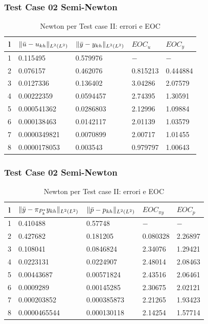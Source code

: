 \documentclass{beamer}
\theoremstyle{definition}
\theoremstyle{remark}
\theoremstyle{plain}
\theoremstyle{definition}
\DeclarePairedDelimiter{\norma}{\lVert}{\rVert}
\begin{document}
\begin{frame}
\frametitle{Test Case 02 Semi-Newton}
\begin{table}
\caption{Newton per Test case II: errori e EOC }
\label{newtonII}
\centering

\begin{tabular}{cllll}
\toprule
{l} &  {$ \norma{\bar{u}-u_{kh}}_{L^2(L^2)} $} &  {$ \norma{\bar{y}-y_{kh}}_{L^2(L^2)} $} &  {$ EOC_{u} $} &  {$ EOC_y $} \\
\midrule
1            &  0.115495 &  0.579976 &  {$-$} &  {$-$} \\
2            &  0.076157  &  0.462076 &  0.815213 &  0.444884 \\
3            &  0.0127336  &  0.136402 &  3.04286 &  2.07579 \\
4            &  0.00222359 &  0.0594457 &  2.74395 &  1.30591 \\
5            &  0.000541362 &  0.0286803 &  2.12996 &  1.09884 \\
6            &  0.000138463  &  0.0142117 &  2.01139 &  1.03579 \\
7            &  0.0000349821 &  0.0070899 &  2.00717 &  1.01455 \\      
8            &  0.0000178053 &  0.003543 &  0.979797  &  1.00643 \\
\bottomrule
\end{tabular}              

\end{table}
\end{frame}

\begin{frame}
\frametitle{Test Case 02 Semi-Newton}
\begin{table}
\caption{Newton per Test case II: errori e EOC }
\label{newtonIIbis}
\centering

\begin{tabular}{cllll}
\toprule
{l}  &  {$ \norma{\bar{y}-\pi_{P^*_k}y_{kh}}_{L^2(L^2)} $}  &  {$ \norma{\bar{p}-p_{kh}}_{L^2(L^2)} $}        &  {$ EOC_{\pi y} $} &  {$ EOC_p $} \\
\midrule
1 			 &  0.410488 &  0.57748 &  {$-$} & {$-$} \\
2            &  0.427682 &  0.181205 &  0.080328 &  2.26897 \\
3            &  0.108041 &  0.0846824 &  2.34076 &  1.29421 \\
4            &  0.0223131  &  0.0224907 &  2.48014 &  2.08463 \\
5            &  0.00443687 &  0.00571824 &  2.43516  &  2.06461 \\
6            &  0.0009289  &  0.00145285 &  2.30675 &  2.02121 \\
7            &  0.000203852 &  0.000385873 &  2.21265 &  1.93423 \\      
8            &  0.0000465544 &  0.000130118 &  2.14254 &  1.57714 \\
\bottomrule
\end{tabular}              

\end{table}

\end{frame}
\end{document}
